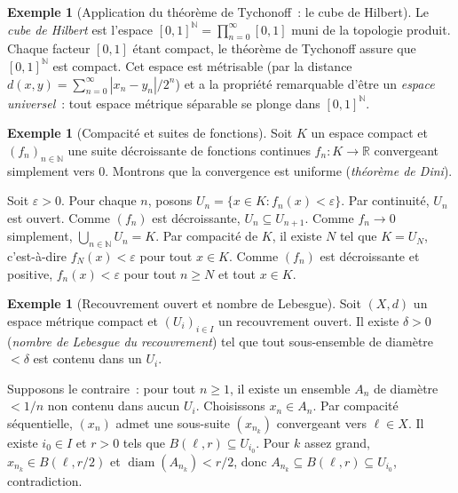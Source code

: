 \documentclass[12pt,a4paper,openany]{book}
\theoremstyle{definition}
\theoremstyle{cours}
\theoremstyle{coursnormal}
\newtheorem{exemple}[theoreme]{Exemple}
\newcommand{\N}{\mathbb{N}}
\newcommand{\R}{\mathbb{R}}
\begin{document}
\begin{exemple}[Application du théorème de Tychonoff~: le cube de
  Hilbert]\label{ex:cube-hilbert}
  Le \emph{cube de Hilbert} est l'espace
  $[0,1]^{\N}=\prod_{n=0}^{\infty}[0,1]$ muni de la topologie produit.
  Chaque facteur $[0,1]$ étant compact, le théorème de Tychonoff assure que
  $[0,1]^{\N}$ est compact. Cet espace est métrisable (par la distance
  $d(x,y)=\sum_{n=0}^{\infty}|x_n-y_n|/2^n$) et a la propriété remarquable
  d'être un \emph{espace universel}~: tout espace métrique séparable se plonge
  dans $[0,1]^{\N}$.
\end{exemple}

\begin{exemple}[Compacité et suites de fonctions]\label{ex:compact-fonctions}
  Soit $K$ un espace compact et $(f_n)_{n\in\N}$ une suite décroissante de
  fonctions continues $f_n\colon K\to\R$ convergeant simplement vers $0$.
  Montrons que la convergence est uniforme (\emph{théorème de
  Dini}).

  Soit $\varepsilon>0$. Pour chaque $n$, posons $U_n=\{x\in K:f_n(x)<
  \varepsilon\}$. Par continuité, $U_n$ est ouvert. Comme $(f_n)$ est
  décroissante, $U_n\subseteq U_{n+1}$. Comme $f_n\to 0$ simplement,
  $\bigcup_{n\in\N}U_n=K$. Par compacité de $K$, il existe $N$ tel que
  $K=U_N$, c'est-à-dire $f_N(x)<\varepsilon$ pour tout $x\in K$. Comme $(f_n)$
  est décroissante et positive, $f_n(x)<\varepsilon$ pour tout $n\geq N$ et
  tout $x\in K$.
\end{exemple}

\begin{exemple}[Recouvrement ouvert et nombre de Lebesgue]\label{ex:lebesgue}
  Soit $(X,d)$ un espace métrique compact et $(U_i)_{i\in I}$ un recouvrement
  ouvert. Il existe $\delta>0$ (\emph{nombre de
  Lebesgue du recouvrement}) tel que tout sous-ensemble de diamètre
  $<\delta$ est contenu dans un $U_i$.

  Supposons le contraire~: pour tout $n\geq 1$, il existe un ensemble $A_n$ de
  diamètre $<1/n$ non contenu dans aucun $U_i$. Choisissons $x_n\in A_n$. Par
  compacité séquentielle, $(x_n)$ admet une sous-suite $(x_{n_k})$ convergeant
  vers $\ell\in X$. Il existe $i_0\in I$ et $r>0$ tels que
  $B(\ell,r)\subseteq U_{i_0}$. Pour $k$ assez grand, $x_{n_k}\in B(\ell,r/2)$
  et $\operatorname{diam}(A_{n_k})<r/2$, donc $A_{n_k}\subseteq B(\ell,r)
  \subseteq U_{i_0}$, contradiction.
\end{exemple}
\end{document}
